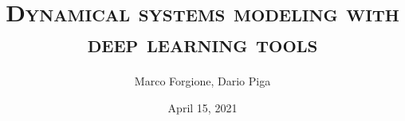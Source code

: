 \usepackage[english]{babel}
\usepackage{amsmath}
\usepackage[latin1]{inputenc}
\usepackage{units}
\usepackage{colortbl}
\usepackage{multimedia}
\usepackage{bm}
\usepackage{subcaption}
\usepackage{algorithm2e}
\usepackage{algorithmic}

{
}
	

\title[Dynamical systems \& deep learning]{\textsc{Dynamical systems modeling with deep learning tools}}


\author[]{Marco Forgione, Dario Piga}



\date[]{April 15, 2021}


\subject{System Identification, Deep Learning, Machine Learning, Regularization}


\newcommand{\So}{S_o} %
\newcommand{\hidden}[1]{\overline{#1}}
\newcommand{\nsamp}{N}
\newcommand{\Yid}{Y}
\newcommand{\Uid}{U}
\newcommand{\Did}{{\mathcal{D}}}
\newcommand{\tens}[1]{\bm{#1}}

\newcommand{\batchsize}{q}
\newcommand{\seqlen}{m}
\newcommand{\nin}{n_u} 
\newcommand{\ny}{n_y} 
\newcommand{\nx}{n_x}

\newcommand{\NN}{\mathcal{N}} %

\newcommand{\norm}[1]{\left \lVert #1 \right \rVert}
\DeclareMathOperator*\argmin{arg \, min}
\newcommand{\Name}{\emph{dynoNet}}


\newcommand{\q}{q} %
\newcommand{\A}{A} %
\newcommand{\ac}{a} %
\newcommand{\B}{B} %
\newcommand{\bb}{b} %
\newcommand{\Gmat}{\mathbb{G}} %
\newcommand{\tvec}[1]{\bm{#1}}
\newcommand{\mat}[1]{\bm{#1}}
\newcommand{\sens}[1]{\tilde{#1}}
\newcommand{\adjoint}[1]{\overline{#1}}
\newcommand{\loss}{\mathcal{L}}
\newcommand{\pdiff}[2]{\frac{\partial #1}{\partial #2}}

\newcommand{\conv}{*}
\newcommand{\ccorr}{\star}
